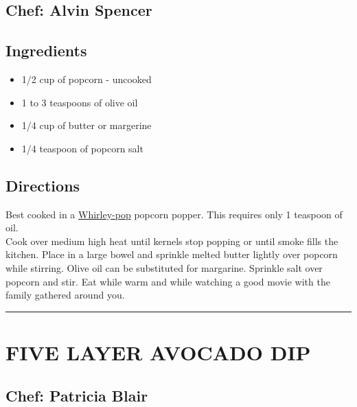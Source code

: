 \documentclass[
]{book}
\providecommand{\tightlist}{%
  \setlength{\itemsep}{0pt}\setlength{\parskip}{0pt}}
\begin{document}
\hypertarget{chef-alvin-spencer}{%
\subsection*{Chef: Alvin Spencer}\label{chef-alvin-spencer}}


\hypertarget{ingredients-4}{%
\subsection*{Ingredients}\label{ingredients-4}}


\begin{itemize}
\tightlist
\item
  1/2 cup of popcorn - uncooked
\item
  1 to 3 teaspoons of olive oil
\item
  1/4 cup of butter or margerine
\item
  1/4 teaspoon of popcorn salt
\end{itemize}

\hypertarget{directions-4}{%
\subsection*{Directions}\label{directions-4}}


Best cooked in a \href{https://www.whirleypopshop.com/}{Whirley-pop} popcorn popper. This requires only 1 teaspoon of oil.\\
Cook over medium high heat until kernels stop popping or until smoke fills the kitchen.
Place in a large bowel and sprinkle melted butter lightly over popcorn while stirring. Olive oil can be substituted for margarine.
Sprinkle salt over popcorn and stir. Eat while warm and while watching a good movie with the family gathered around you.

\begin{center}\rule{0.5\linewidth}{0.5pt}\end{center}

\hypertarget{five-layer-avocado-dip}{%
\section*{FIVE LAYER AVOCADO DIP}\label{five-layer-avocado-dip}}


\hypertarget{chef-patricia-blair-2}{%
\subsection*{Chef: Patricia Blair}\label{chef-patricia-blair-2}}
\end{document}
